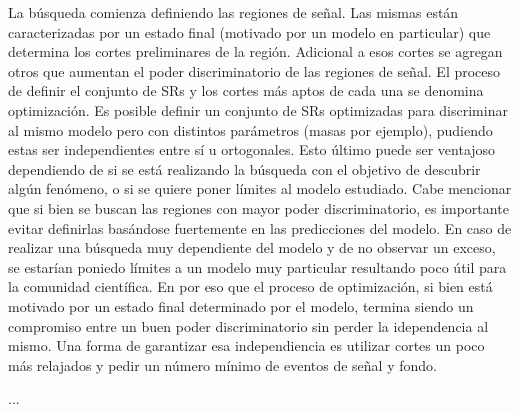 La búsqueda comienza definiendo las regiones de señal. Las mismas están caracterizadas por un estado final (motivado por un modelo en particular) que determina los cortes preliminares de la región. Adicional a esos cortes se agregan otros que aumentan el poder discriminatorio de las regiones de señal. El proceso de definir el conjunto de SRs y los cortes más aptos de cada una se denomina optimización. Es posible definir un conjunto de SRs optimizadas para discriminar al mismo modelo pero con distintos parámetros (masas por ejemplo), pudiendo estas ser independientes entre sí u ortogonales. Esto último puede ser ventajoso dependiendo de si se está realizando la búsqueda con el objetivo de descubrir algún fenómeno, o si se quiere poner límites al modelo estudiado. Cabe mencionar que si bien se buscan las regiones con mayor poder discriminatorio, es importante evitar definirlas basándose fuertemente en las predicciones del modelo. En caso de realizar una búsqueda muy dependiente del modelo y de no observar un exceso, se estarían poniedo límites a un modelo muy particular resultando poco útil para la comunidad científica. En por eso que el proceso de optimización, si bien está motivado por un estado final determinado por el modelo, termina siendo un compromiso entre un buen poder discriminatorio sin perder la idependencia al mismo. Una forma de garantizar esa independiencia es utilizar cortes un poco más relajados y pedir un número mínimo de eventos de señal y fondo.

 ...


